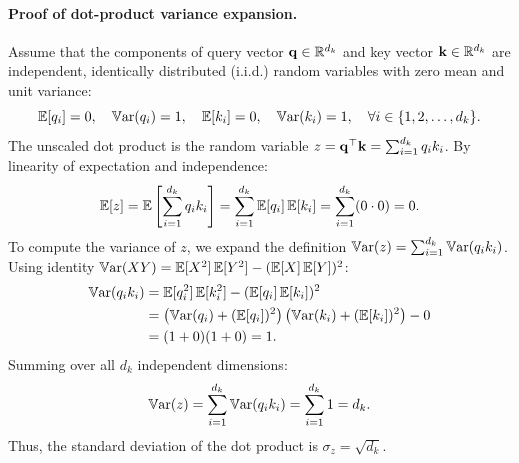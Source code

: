 \documentclass[../../main.tex]{subfiles}
\begin{document}
\paragraph{Proof of dot-product variance expansion.}
Assume that the components of query vector $\vq \in \R^{d_k}$ and key vector $\vk \in \R^{d_k}$ are independent, identically distributed (i.i.d.) random variables with zero mean and unit variance:
\begin{equation}
\E[q_i] = 0, \quad \Var(q_i) = 1, \quad \E[k_i] = 0, \quad \Var(k_i) = 1, \quad \forall i \in \{1, 2, \dots, d_k\}.
\end{equation}
The unscaled dot product is the random variable $z = \vq^\top \vk = \sum_{i=1}^{d_k} q_i k_i$.
By linearity of expectation and independence:
\begin{equation}
\E[z] = \E\left[\sum_{i=1}^{d_k} q_i k_i\right] = \sum_{i=1}^{d_k} \E[q_i]\E[k_i] = \sum_{i=1}^{d_k} (0 \cdot 0) = 0.
\end{equation}
To compute the variance of $z$, we expand the definition $\Var(z) = \sum_{i=1}^{d_k} \Var(q_i k_i)$. Using identity $\Var(X Y) = \E[X^2]\E[Y^2] - (\E[X]\E[Y])^2$:
\begin{align}
\Var(q_i k_i) &= \E[q_i^2]\E[k_i^2] - (\E[q_i]\E[k_i])^2 \nonumber \\
&= \left(\Var(q_i) + (\E[q_i])^2\right)\left(\Var(k_i) + (\E[k_i])^2\right) - 0 \nonumber \\
&= (1 + 0)(1 + 0) = 1.
\end{align}
Summing over all $d_k$ independent dimensions:
\begin{equation}
\label{eq:variance_unscaled_dot_product}
\Var(z) = \sum_{i=1}^{d_k} \Var(q_i k_i) = \sum_{i=1}^{d_k} 1 = d_k.
\end{equation}
Thus, the standard deviation of the dot product is $\sigma_z = \sqrt{d_k}$.
\end{document}
